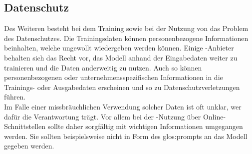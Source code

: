 \documentclass[../main.tex]{subfiles}
\begin{document}
\subsection{Datenschutz}
\label{sec:datenschutz}

Des Weiteren besteht bei dem Training sowie bei der Nutzung von  das Problem des Datenschutzes. Die Trainingsdaten können personenbezogene Informationen beinhalten, welche ungewollt 
wiedergeben werden können. Einige -Anbieter behalten sich das Recht vor, das Modell anhand der 
Eingabedaten weiter zu trainieren und die Daten anderweitig zu nutzen\cite{OpenAI_Datenschutzerklaerung_2025,MistralAI_Terms_2025}. Auch so können personenbezogenen oder unternehmensspezifischen Informationen in die Trainings- oder Ausgabedaten 
erscheinen und so zu Datenschutzverletzungen führen.\\ Im Falle einer missbräuchlichen Verwendung solcher Daten ist oft unklar, wer dafür die Verantwortung trägt. Vor allem bei der -Nutzung 
über Online-Schnittstellen sollte daher sorgfältig mit wichtigen Informationen umgegangen werden. Sie sollten beispielsweise nicht in Form des \gls{glos:prompt}s an das Modell gegeben werden.
\end{document}
